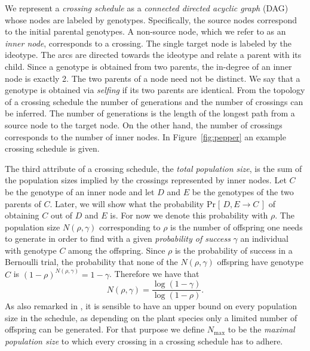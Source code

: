 \documentclass[runningheads]{llncs}
\renewcommand{\Pr}[2][]{\mathrm{Pr}_{#1} [\, #2 \, ]}
\newcommand{\gen}{\ensuremath{\mathrm{gen}}}
\newcommand{\cross}{\ensuremath{\mathit{cross}}}
\newcommand{\pop}{\ensuremath{\mathrm{pop}}}
\newcommand{\cost}{\ensuremath{\mathit{cost}}}
\begin{document}
We represent a \emph{crossing schedule} as a \emph{connected directed acyclic graph} (DAG) whose nodes are labeled by genotypes. Specifically, the source nodes correspond to the initial parental genotypes. A non-source node, which we refer to as an \emph{inner node}, corresponds to a crossing. The single target node is labeled by the ideotype. The arcs are directed towards the ideotype and relate a parent with its child. Since a genotype is obtained from two parents, the in-degree of an inner node is exactly 2. The two parents of a node need not be distinct. We say that a genotype is obtained via \emph{selfing} if its two parents are identical. From the topology of a crossing schedule the number of generations and the number of crossings can be inferred. The number of generations is the length of the longest path from a source node to the target node. On the other hand, the number of crossings corresponds to the number of inner nodes. In Figure~\ref{fig:pepper} an example crossing schedule is given.


The third attribute of a crossing schedule, the \emph{total population size}, is the sum of the population sizes implied by the crossings represented by inner nodes. Let $C$ be the genotype of an inner node and let $D$ and $E$ be the genotypes of the two parents of $C$. Later, we will show what the probability $\Pr{D,E \rightarrow C}$ of obtaining $C$ out of $D$ and $E$ is. For now we denote this probability with $\rho$. The population size $N(\rho, \gamma)$ corresponding to $\rho$ is the number of offspring one needs to generate in order to find with a given \emph{probability of success} $\gamma$ an individual with genotype $C$ among the offspring. Since $\rho$ is the probability of success in a Bernoulli trial, the probability that none of the $N(\rho, \gamma)$ offspring have genotype $C$ is $(1 - \rho)^{N(\rho,\gamma)} = 1-\gamma$. Therefore we have that
\begin{equation}
\label{eq:popsize}
N(\rho, \gamma) = \frac{\log(1-\gamma)}{\log(1-\rho)}.
\end{equation}
As also remarked in \cite{Servin:2004}, it is sensible to have an upper bound on every population size in the schedule, as depending on the plant species only a limited number of offspring can be generated. For that purpose we define $N_\mathrm{max}$ to be the \emph{maximal population size} to which every crossing in a crossing schedule has to adhere.
\end{document}

